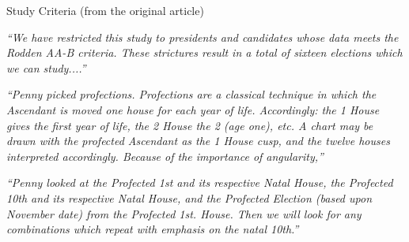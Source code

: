 \begin{frame}[t]{Study Criteria (from the original article)}
\centering
\begin{minipage}{0.8\textwidth}
\textsl{“We have restricted this study to presidents and candidates whose data meets the Rodden AA-B criteria. These strictures result in a total of sixteen elections which we can study....''}

\vspace{2em}
\textsl{``Penny picked profections. Profections are a classical technique in which the Ascendant is moved one house for each year of life. Accordingly: the 1 House gives the first year of life, the 2 House the 2 (age one), etc. A chart may be drawn with the profected Ascendant as the 1 House cusp, and the twelve houses interpreted accordingly. Because of the importance of angularity,''}

\vspace{2em}
\textsl{``Penny looked at the Profected 1st and its respective Natal House, the Profected 10th and its respective Natal House, and the Profected Election (based upon November date) from the Profected 1st. House. Then we will look for any combinations which repeat with emphasis on the natal 10th.”}

\end{minipage}
\end{frame}